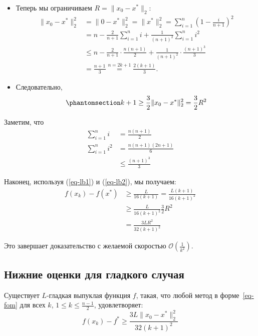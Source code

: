 \documentclass[
  russian,
  letterpaper,
  DIV=11,
  numbers=noendperiod]{scrartcl}
\begin{document}
\begin{itemize}
\item
  Теперь мы ограничиваем \(R = \|x_0 - x^*\|_2\): \[
    \begin{aligned}
    \|x_0 - x^*\|_2^2 &= \|0 - x^*\|_2^2 = \|x^*\|_2^2 = \sum_{i=1}^n \left( 1 - \frac{i}{n+1} \right)^2 \\
    &= n - \frac{2}{n+1} \sum_{i=1}^{n} i + \frac{1}{(n+1)^2} \sum_{i=1}^{n} i^2 \\
    &\leq n - \frac{2}{n+1} \cdot \frac{n(n+1)}{2} + \frac{1}{(n+1)^2} \cdot \frac{(n+1)^3}{3} \\
    &= \frac{n+1}{3} \overset{n = 2k+1}{=} \frac{2(k+1)}{3}.
    \end{aligned}
    \]
\item
  Следовательно, \begin{equation}\phantomsection\label{eq-lb2}{
    k+1 \geq \frac{3}{2}\|x_0 - x^*\|_2^2 = \frac32 R^2
    }\end{equation}
\end{itemize}

Заметим, что \[
\begin{aligned}
\sum_{i=1}^{n} i &= \frac{n(n+1)}{2} \\
\sum_{i=1}^{n} i^2 &= \frac{n(n+1)(2n+1)}{6} \\
&\leq \frac{(n+1)^3}{3}
\end{aligned}
\]

Наконец, используя (\ref{eq-lb1}) и (\ref{eq-lb2}), мы получаем: \[
\begin{aligned}
f(x_k) - f(x^*) &\geq \frac{L}{16(k+1)}  = \frac{L (k+1)}{16(k+1)^2} \\
&\geq \frac{L}{16(k+1)^2} \frac{3}{2} R^2  \\
&= \frac{3L R^2}{32 (k+1)^2}
\end{aligned}
\]

Это завершает доказательство с желаемой скоростью
\(\mathcal{O}\left( \frac{1}{k^2}\right)\).

\subsection{Нижние оценки для гладкого
случая}\label{ux43dux438ux436ux43dux438ux435-ux43eux446ux435ux43dux43aux438-ux434ux43bux44f-ux433ux43bux430ux434ux43aux43eux433ux43e-ux441ux43bux443ux447ux430ux44f}

\begin{tcolorbox}[enhanced jigsaw, rightrule=.15mm, coltitle=black, title=\textcolor{quarto-callout-color}{\faInfo}\hspace{0.5em}{Гладкий выпуклый случай}, colbacktitle=quarto-callout-color!10!white, opacityback=0, colframe=quarto-callout-color-frame, bottomtitle=1mm, toptitle=1mm, titlerule=0mm, arc=.35mm, leftrule=.75mm, breakable, toprule=.15mm, bottomrule=.15mm, opacitybacktitle=0.6, left=2mm, colback=white]

Существует \(L\)-гладкая выпуклая функция \(f\), такая, что любой метод
в форме~\ref{eq-fom} для всех \(k\), \(1 \leq k \leq \frac{n-1}{2}\),
удовлетворяет: \[
f(x_k) - f^* \geq \frac{3L \|x_0 - x^*\|_2^2}{32(k+1)^2}
\]

\end{tcolorbox}
\end{document}
